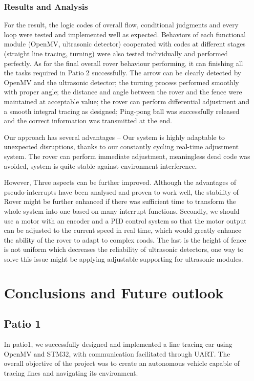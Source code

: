 \documentclass[12pt, a4paper, oneside]{report}
\begin{document}
\subsection{Results and Analysis}
For the result, the logic codes of overall flow, conditional judgments and every loop were tested and implemented well as expected. Behaviors of each functional module (OpenMV, ultrasonic detector) cooperated with codes at different stages (straight line tracing, turning) were also tested individually and performed perfectly. As for the final overall rover behaviour performing, it can finishing all the tasks required in Patio 2 successfully. The arrow can be clearly detected by OpenMV and the ultrasonic detector; the turning process performed smoothly with proper angle; the distance and angle between the rover and the fence were maintained at acceptable value; the rover can perform differential adjustment and a smooth integral tracing as designed; Ping-pong ball was successfully released and the correct information was transmitted at the end.

Our approach has several advantages -- Our system is highly adaptable to unexpected disruptions, thanks to our constantly cycling real-time adjustment system. The rover can perform immediate adjustment, meaningless dead code was avoided, system is quite stable against environment interference.

However, Three aspects can be further improved. Although the advantages of pseudo-interrupts have been analysed and proven to work well, the stability of Rover might be further enhanced if there was sufficient time to transform the whole system into one based on many interrupt functions. Secondly, we should use a motor with an encoder and a PID control system so that the motor output can be adjusted to the current speed in real time, which would greatly enhance the ability of the rover to adapt to complex roads. The last is the height of fence is not uniform which decreases the reliability of ultrasonic detectors, one way to solve this issue might be applying adjustable supporting for ultrasonic modules.

\newpage

\chapter{Conclusions and Future outlook}
\section{Patio 1}
In patio1, we successfully designed and implemented a line tracing car using OpenMV and STM32, with communication facilitated through UART. The overall objective of the project was to create an autonomous vehicle capable of tracing lines and navigating its environment.
\end{document}

